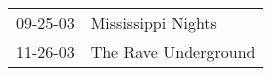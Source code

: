 \begin{supertabular}{p{0.25\columnwidth}p{0.75\columnwidth}}
 09-25-03 &    Mississippi Nights \\
 11-26-03 &  The Rave Underground \\
\end{supertabular}
